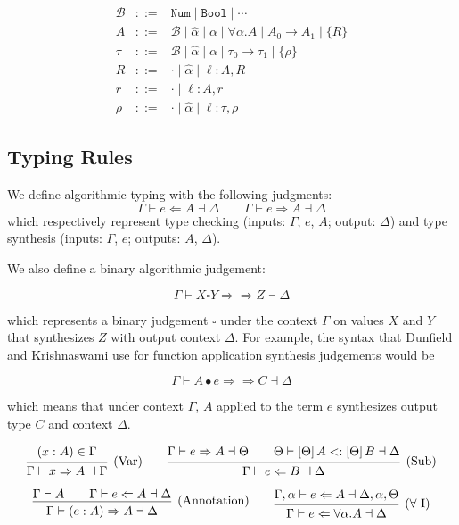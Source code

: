\documentclass{article}
\newcommand{\B}{\mathcal{B}}
\newcommand{\bottom}{\perp}
\newcommand{\define}{::=}
\newcommand{\subsume}{<:}
\newcommand{\synthesizes}{\Rightarrow \!\!\! \Rightarrow}
\newcommand{\app}{\bullet}
\newcommand{\ev}{\hat}
\newcommand{\spc}{\qquad}
\newcommand{\apply}[1]{\left[#1\right]}
\newcommand{\synth}[4]{#1 \vdash #2 \Rightarrow #3 \dashv #4}
\renewcommand{\check}[4]{#1 \vdash #2 \Leftarrow #3 \dashv #4}
\newcommand{\presynth}[6]{#1 \vdash #2 #3 #4 \synthesizes #5 \dashv #6}
\newcommand{\subsumes}[4]{#1 \vdash #2 \subsume #3 \dashv #4}
\newcommand{\deduct}[3][]
{
  \begin{prooftree}
    \hypo{#2}
    \infer1[\text{#1}]{#3}
  \end{prooftree}
}
\begin{document}
\[\begin{array}{rcl}
\B & \define & \texttt{Num} \mid \texttt{Bool} \mid \cdots
\\
A & \define & \B \mid \ev\alpha \mid \alpha \mid \forall \alpha. A \mid A_0 \to A_1 \mid \{R\}
\\
\tau & \define & \B \mid \ev\alpha \mid \alpha \mid \tau_0 \to \tau_1 \mid \{\rho\}
\\
R & \define & \cdot \mid \ev\alpha \mid \ell : A, R
\\
r & \define & \cdot \mid \ell : A, r
\\
\rho & \define & \cdot \mid \ev\alpha \mid \ell : \tau, \rho
\end{array}
\]

\subsection{Typing Rules}
We define algorithmic typing with the following judgments:
\[
\check{\Gamma}{e}{A}{\Delta}
\spc
\synth{\Gamma}{e}{A}{\Delta}
\]
which respectively represent type checking (inputs: $\Gamma$, $e$, $A$; output: $\Delta$) and type synthesis (inputs: $\Gamma$, $e$; outputs: $A$, $\Delta$).

We also define a binary algorithmic judgement:

\[
\presynth{\Gamma}{X}{\square}{Y}{Z}{\Delta}
\]

which represents a binary judgement \(\square\) under the context \(\Gamma\) on
values \(X\) and \(Y\) that synthesizes \(Z\) with output context \(\Delta\).
For example, the syntax that Dunfield and Krishnaswami use for function
application synthesis judgements would be

\[
\presynth \Gamma A \app e C \Delta
\]

which means that under context \(\Gamma\), \(A\) applied to the term \(e\)
synthesizes output type \(C\) and context \(\Delta\).

\[
  \deduct[(Var)]
  {
    (x : A) \in \Gamma
  }
  { \synth{\Gamma}{x}{A}{\Gamma} }
  \spc
  \deduct[(Sub)]
  {
    \synth{\Gamma}{e}{A}{\Theta} \spc
    \subsumes{\Theta}{\apply\Theta A}{\apply\Theta B}{\Delta}
  }
  { \check{\Gamma}{e}{B}{\Delta} }
\]

\[
  \deduct[(Annotation)]
  { \Gamma \vdash A \spc \check{\Gamma}{e}{A}{\Delta} }
  { \synth{\Gamma}{(e : A)}{A}{\Delta} }
  \spc
  \deduct[(\(\forall\) I)]
  { \check{\Gamma, \alpha}{e}{A}{\Delta, \alpha, \Theta} }
  { \check{\Gamma}{e}{\forall \alpha. A}{\Delta} }
\]
\end{document}
